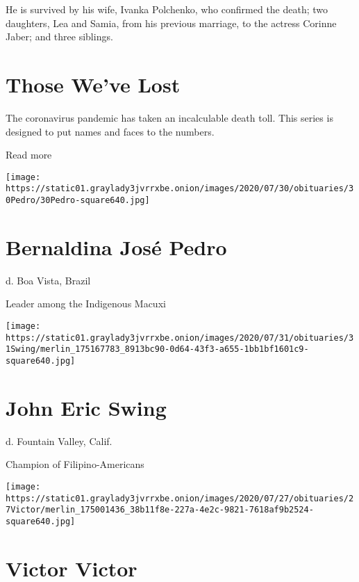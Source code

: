 He is survived by his wife, Ivanka Polchenko, who confirmed the death;
two daughters, Lea and Samia, from his previous marriage, to the actress
Corinne Jaber; and three siblings.

\href{https://www.nytimes3xbfgragh.onion/interactive/2020/obituaries/people-died-coronavirus-obituaries.html?action=click\&pgtype=Article\&state=default\&region=BELOW_MAIN_CONTENT\&context=covid_obits_promo}{}

\hypertarget{those-weve-lost}{%
\section{Those We've Lost}\label{those-weve-lost}}

The coronavirus pandemic has taken an incalculable death toll. This
series is designed to put names and faces to the numbers.

Read more

\texttt{[image: https://static01.graylady3jvrrxbe.onion/images/2020/07/30/obituaries/30Pedro/30Pedro-square640.jpg]}

\hypertarget{bernaldina-josuxe9-pedro}{%
\section{Bernaldina José Pedro}\label{bernaldina-josuxe9-pedro}}

d. Boa Vista, Brazil

Leader among the Indigenous Macuxi

\texttt{[image: https://static01.graylady3jvrrxbe.onion/images/2020/07/31/obituaries/31Swing/merlin\_175167783\_8913bc90-0d64-43f3-a655-1bb1bf1601c9-square640.jpg]}

\hypertarget{john-eric-swing}{%
\section{John Eric Swing}\label{john-eric-swing}}

d. Fountain Valley, Calif.

Champion of Filipino-Americans

\texttt{[image: https://static01.graylady3jvrrxbe.onion/images/2020/07/27/obituaries/27Victor/merlin\_175001436\_38b11f8e-227a-4e2c-9821-7618af9b2524-square640.jpg]}

\hypertarget{victor-victor}{%
\section{Victor Victor}\label{victor-victor}}

